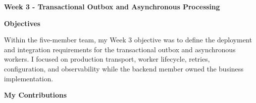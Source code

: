 \vspace{0.5em}\noindent\textbf{Week 3 - Transactional Outbox and Asynchronous
Processing}\par

\vspace{0.5em}\noindent\textbf{Objectives}\par

Within the five-member team, my Week 3 objective was to define the
deployment and integration requirements for the transactional outbox and
asynchronous workers. I focused on production transport, worker
lifecycle, retries, configuration, and observability while the backend
member owned the business implementation.

\vspace{0.5em}\noindent\textbf{My Contributions}\par


